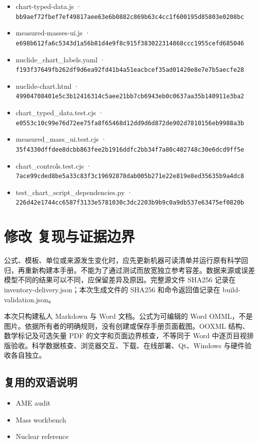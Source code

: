 \documentclass[
  11pt,
  letterpaper,
]{article}
\providecommand{\tightlist}{%
  \setlength{\itemsep}{0pt}\setlength{\parskip}{0pt}}
\begin{document}
\begin{itemize}
\item
  chart-typed-data.js ·
  \texttt{bb9aef72fbef7ef49817aee63e6b0882c869b63c4cc1f600195d85803e0208bc}
\item
  measured-masses-ui.js ·
  \texttt{e698b612fa6c5343d1a56b81d4e9f8c915f383022314868ccc1955cefd685046}
\item
  nuclide\_chart\_labels.yaml ·
  \texttt{f193f37649fb262df9d6ea92fd41b4a51eacbcef35ad01420e8e7e7b5aecfe28}
\item
  nuclide-chart.html ·
  \texttt{49904708401e5c3b12416314c5aee21bb7cb6943eb0c0637aa35b140911e3ba2}
\item
  chart\_typed\_data.test.cjs ·
  \texttt{e0553c10c99e76d72ee75fa8f65468d12dd9d6d872de902d7810156eb9988a3b}
\item
  measured\_mass\_ui.test.cjs ·
  \texttt{35f4330dffdee8dcbb863fee2b1916ddfc2bb34f7a80c402748c30e6dcd9ff5e}
\item
  chart\_controls.test.cjs ·
  \texttt{7ace99cded8be5a33c83f3c19692878dab005b271e22e819e8ed35635b9a4dc8}
\item
  test\_chart\_script\_dependencies.py ·
  \texttt{226d42e1744cc6587f3133e5781030c3dc2203b9b9c0a9db537e63475ef0820b}
\end{itemize}

\section{修改
复现与证据边界}\label{ux4feeux6539-ux590dux73b0ux4e0eux8bc1ux636eux8fb9ux754c}

公式、模板、单位或来源发生变化时，应先更新机器可读清单并运行原有科学回归，再重新构建本手册。不能为了通过测试而放宽独立参考容差。数据来源或误差模型不同的结果可以不同，应保留差异及原因。完整源文件
SHA256 记录在 inventory-delivery.json；本次生成文件的 SHA256
和命令返回值记录在 build-validation.json。

本次只构建私人 Markdown 与 Word 文档。公式为可编辑的 Word
OMML，不是图片。依据所有者的明确规则，没有创建或保存手册页面截图。OOXML
结构、数学标记及可选矢量 PDF 的文字和页面边界核查，不等同于 Word
中逐页目视排版验收。科学数据核查、浏览器交互、下载、在线部署、Qt、Windows
与硬件验收各自独立。

\subsection{复用的双语说明}\label{ux590dux7528ux7684ux53ccux8bedux8bf4ux660e}

\begin{itemize}
\tightlist
\item
  AME audit
\item
  Mass workbench
\item
  Nuclear reference
\end{itemize}
\end{document}
